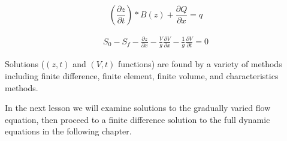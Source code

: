 \begin{equation}
( \frac{\partial z}{\partial t}) *B(z) + \frac{\partial Q}{\partial x} = q
\label{eqn:continunity}
\end{equation}

\begin{equation}
\begin{split}
S_0 - S_f  -  \frac{\partial z}{\partial x} - \frac{V}{g}\frac{\partial V}{\partial x}
- \frac{1}{g}\frac{\partial V }{\partial t} = 0
\end{split}
\label{eqn:momentum_complete}
\end{equation}


Solutions ($(z,t)$ and $(V,t)$ functions) are found by a variety of methods including finite difference, finite element, finite volume, and characteristics methods.

In the next lesson we will examine solutions to the gradually varied flow equation, then proceed to a finite difference solution to the full dynamic equations in the following chapter.




